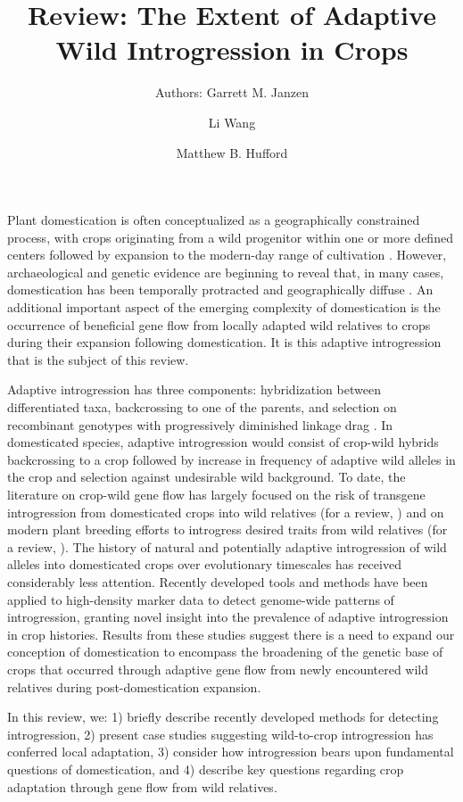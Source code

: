 \documentclass[11pt]{article}
\title{Review: The Extent of Adaptive Wild Introgression in Crops}
\author[1]{Authors: Garrett M. Janzen}%
\author[1]{Li Wang}
\author[1,*]{Matthew B. Hufford}
\affil[1]{Department of Ecology, Evolution, and Organismal Biology, Iowa State University, Ames, Iowa, USA}
\affil[*]{Correspondence: mhufford@iastate.edu (M.B. Hufford)}
\date{}
\begin{document}
\maketitle

Plant domestication is often conceptualized as a geographically constrained process, with crops originating from a wild progenitor within one or more defined centers followed by expansion to the modern-day range of cultivation \cite{Harlan1992}.
However, archaeological and genetic evidence are beginning to reveal that, in many cases, domestication has been temporally protracted and geographically diffuse \cite{Meyer2016, Wang2017, Fuller2014}.
An additional important aspect of the emerging complexity of domestication is the occurrence of beneficial gene flow from locally adapted wild relatives to crops during their expansion following domestication.
It is this adaptive introgression that is the subject of this review.

Adaptive introgression has three components: hybridization between differentiated taxa, backcrossing to one of the parents, and selection on recombinant genotypes with progressively diminished linkage drag \cite{barton2001role}.
In domesticated species, adaptive introgression would consist of crop-wild hybrids backcrossing to a crop followed by increase in frequency of adaptive wild alleles in the crop and selection against undesirable wild background.
To date, the literature on crop-wild gene flow has largely focused on the risk of transgene introgression from domesticated crops into wild relatives (for a review, \cite{stewart2003transgene}) and on modern plant breeding efforts to introgress desired traits from wild relatives (for a review, \cite{Dempewolf2017}).
The history of natural and potentially adaptive introgression of wild alleles into domesticated crops over evolutionary timescales has received considerably less attention.
Recently developed tools and methods have been applied to high-density marker data to detect genome-wide patterns of introgression, granting novel insight into the prevalence of adaptive introgression in crop histories.
Results from these studies suggest there is a need to expand our conception of domestication to encompass the broadening of the genetic base of crops that occurred through adaptive gene flow from newly encountered wild relatives during post-domestication expansion.

In this review, we: 1) briefly describe recently developed methods for detecting introgression, 2) present case studies suggesting wild-to-crop introgression has conferred local adaptation, 3) consider how introgression bears upon fundamental questions of domestication, and 4) describe key questions regarding crop adaptation through gene flow from wild relatives.
\end{document}
